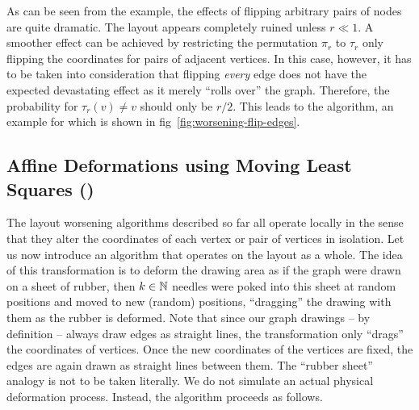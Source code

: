 \documentclass{graphstudy}
\begin{document}
As can be seen from the example, the effects of flipping arbitrary pairs of nodes are quite dramatic.  The layout
appears completely ruined unless \(r\ll1\).  A smoother effect can be achieved by restricting the permutation \(\pi_r\)
to \(\tau_r\) only flipping the coordinates for pairs of adjacent vertices.  In this case, however, it has to be taken
into consideration that flipping \emph{every} edge does not have the expected devastating effect as it merely
\enquote{rolls over} the graph.  Therefore, the probability for \(\tau_r(v)\neq{}v\) should only be \(r/2\).  This leads
to the  algorithm, an example for which is shown in \acl{fig}~\ref{fig:worsening-flip-edges}.


\subsection{Affine Deformations using Moving Least Squares ()}
\label{sec:movlsq}

The layout worsening algorithms described so far all operate locally in the sense that they alter the coordinates of
each vertex or pair of vertices in isolation.  Let us now introduce an algorithm that operates on the layout as a whole.
The idea of this transformation is to deform the drawing area as if the graph were drawn on a sheet of rubber, then
\(k\in\mathbb{N}\) needles were poked into this sheet at random positions and moved to new (random) positions,
\enquote{dragging} the drawing with them as the rubber is deformed.  Note that since our graph drawings -- by definition
-- always draw edges as straight lines, the transformation only \enquote{drags} the coordinates of vertices.  Once the
new coordinates of the vertices are fixed, the edges are again drawn as straight lines between them.  The
\enquote{rubber sheet} analogy is not to be taken literally.  We do not simulate an actual physical deformation process.
Instead, the  algorithm proceeds as follows.
\end{document}
